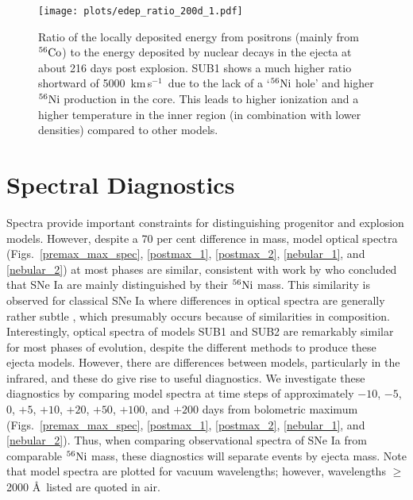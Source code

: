 \documentclass[useAMS,usenatbib,useasmath]{mnras}
\newcommand{\kms}{\hbox{km$\,$s$^{-1}$}}
\newcommand{\elem}[2][default]{$^{#1}{\rm #2}$}
\def\figs{Figs.}
\begin{document}
\begin{figure} 
\begin{minipage}[t]{\linewidth}
\centering
\texttt{[image: plots/edep\_ratio\_200d\_1.pdf]}
\end{minipage}
\caption{Ratio of the locally deposited energy from positrons (mainly from \elem[56]{Co}) to the energy deposited by nuclear decays in the ejecta at about 216 days post explosion. SUB1 shows a much higher ratio shortward of 5000~\kms\ due to the lack of a `\elem[56]{Ni} hole' and higher \elem[56]{Ni} production in the core. This leads to higher ionization and a higher temperature in the inner region (in combination with lower densities) compared to other models.}
\label{edep_ratio}
\end{figure}

\section{Spectral Diagnostics}\label{section_spec_evo} %
Spectra provide important constraints for distinguishing progenitor and explosion models. However, despite a 70 per cent difference in mass, model optical spectra (\figs~\ref{premax_max_spec}, \ref{postmax_1}, \ref{postmax_2}, \ref{nebular_1}, and \ref{nebular_2}) at most phases are similar, consistent with work by \cite{Blondin2013} who concluded that SNe Ia are mainly distinguished by their \elem[56]{Ni} mass. This similarity is  observed for classical SNe Ia where differences in optical spectra are generally rather subtle \citep{Filippenko1997}, which presumably occurs because of similarities in composition. Interestingly, optical spectra of models SUB1 and SUB2 are remarkably similar for most phases of evolution, despite the different methods to produce these ejecta models.  However, there are differences between models, particularly in the infrared, and these do give rise to useful diagnostics. We investigate these diagnostics by comparing model spectra at  time steps of approximately $-10$, $-5$, $0$, $+5$, $+10$, $+20$, $+50$, $+100$, and $+200$ days from bolometric maximum (\figs~\ref{premax_max_spec}, \ref{postmax_1}, \ref{postmax_2}, \ref{nebular_1}, and \ref{nebular_2}). Thus, when comparing observational spectra of SNe Ia from comparable \elem[56]{Ni} mass, these diagnostics will separate events by ejecta mass. Note that model spectra are plotted for vacuum wavelengths; however, wavelengths $\geq$2000 \AA\ listed are quoted in air.
\end{document}
